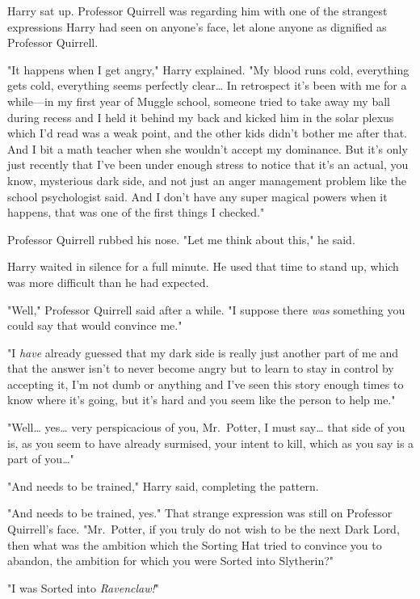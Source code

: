 Harry sat up. Professor Quirrell was regarding him with one of the strangest expressions Harry had seen on anyone's face, let alone anyone as dignified as Professor Quirrell.

"It happens when I get angry," Harry explained. "My blood runs cold, everything gets cold, everything seems perfectly clear{\ldots} In retrospect it's been with me for a while---in my first year of Muggle school, someone tried to take away my ball during recess and I held it behind my back and kicked him in the solar plexus which I'd read was a weak point, and the other kids didn't bother me after that. And I bit a math teacher when she wouldn't accept my dominance. But it's only just recently that I've been under enough stress to notice that it's an actual, you know, mysterious dark side, and not just an anger management problem like the school psychologist said. And I don't have any super magical powers when it happens, that was one of the first things I checked."

Professor Quirrell rubbed his nose. "Let me think about this," he said.

Harry waited in silence for a full minute. He used that time to stand up, which was more difficult than he had expected.

"Well," Professor Quirrell said after a while. "I suppose there \emph{was} something you could say that would convince me."

"I \emph{have} already guessed that my dark side is really just another part of me and that the answer isn't to never become angry but to learn to stay in control by accepting it, I'm not dumb or anything and I've seen this story enough times to know where it's going, but it's hard and you seem like the person to help me."

"Well{\ldots} yes{\ldots} very perspicacious of you, Mr.~Potter, I must say{\ldots} that side of you is, as you seem to have already surmised, your intent to kill, which as you say is a part of you{\ldots}"

"And needs to be trained," Harry said, completing the pattern.

"And needs to be trained, yes." That strange expression was still on Professor Quirrell's face. "Mr.~Potter, if you truly do not wish to be the next Dark Lord, then what was the ambition which the Sorting Hat tried to convince you to abandon, the ambition for which you were Sorted into Slytherin?"

"I was Sorted into \emph{Ravenclaw!}"

